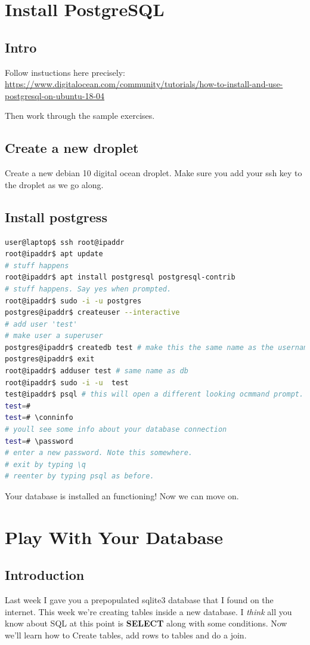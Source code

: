 \documentclass[12pt,a4paper]{article}
\begin{document}
\section{Install PostgreSQL}

\subsection{Intro}
Follow instuctions here precisely:
\url{https://www.digitalocean.com/community/tutorials/how-to-install-and-use-postgresql-on-ubuntu-18-04}

Then work through the sample exercises.

\subsection{Create a new droplet}
Create a new debian 10 digital ocean droplet. Make sure you add your ssh key to the droplet as we go along.

\subsection{Install postgress}
\begin{lstlisting}[language=bash]
user@laptop$ ssh root@ipaddr
root@ipaddr$ apt update
# stuff happens
root@ipaddr$ apt install postgresql postgresql-contrib
# stuff happens. Say yes when prompted.
root@ipaddr$ sudo -i -u postgres
postgres@ipaddr$ createuser --interactive
# add user 'test'
# make user a superuser
postgres@ipaddr$ createdb test # make this the same name as the username you created
postgres@ipaddr$ exit
root@ipaddr$ adduser test # same name as db
root@ipaddr$ sudo -i -u  test
test@ipaddr$ psql # this will open a different looking ocmmand prompt. That is the postgres prompt
test=# 
test=# \conninfo
# youll see some info about your database connection
test=# \password
# enter a new password. Note this somewhere.
# exit by typing \q
# reenter by typing psql as before.
\end{lstlisting}

Your database is installed an functioning! Now we can move on.

\section{ Play With Your Database }

\subsection{Introduction}
Last week I gave you a prepopulated sqlite3 database that I found on the
internet. This week we're creating tables inside a new database. I \textit{think}
all you know about SQL at this point is \textbf{SELECT} along with some
conditions. Now we'll learn how to Create tables, add rows to tables and do a
join.
\end{document}
